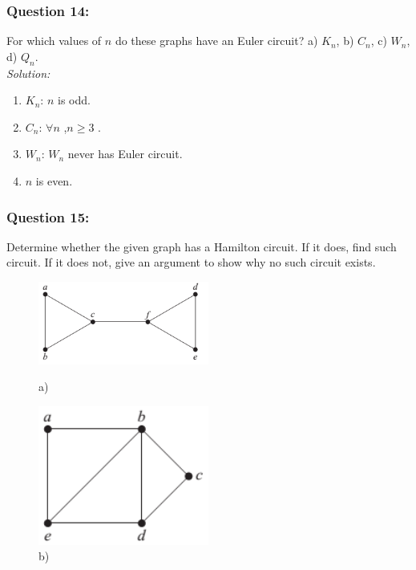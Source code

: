 \documentclass[a4paper]{article}
\begin{document}
	\subsubsection*{Question 14:}
	For which values of $n$ do these graphs have an Euler circuit? a) $K_n$, b) $C_n$, c) $W_n$, d) $Q_n$.\\
	\emph{Solution:}
	\begin{enumerate}[label = \alph*)]
	    \item $K_n$: $n$ is odd.
	    \item $C_n$: $\forall n$ ,$n \geq 3$ .
	    \item $W_n$: $W_n$  never has Euler circuit.
	    \item $n$ is even.
	\end{enumerate}
	\subsubsection*{Question 15:}
	Determine whether the given graph has a Hamilton circuit. If it does, find such circuit. If it does not, give an argument to show why no such circuit exists.
	\begin{figure}[H]
		\begin{minipage}{0.5\textwidth}
			\centering
			\includegraphics[width=0.5\textwidth]{tut915_1.png}
			\caption*{a)}
		\end{minipage}
		\begin{minipage}{0.5\textwidth}
			\centering
			\includegraphics[width=0.5\textwidth]{tut915_2.png}
			\caption*{b)}
		\end{minipage}
	\end{figure}
\end{document}
